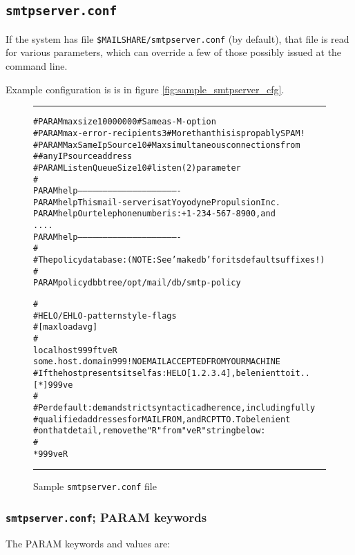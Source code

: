 \subsection{\tt smtpserver.conf}

If the system has file  {\tt \$MAILSHARE/smtpserver.conf} (by default),
that file is read for various parameters, which can override a few
of those possibly issued at the command line.

Example configuration is is in figure \vref{fig:sample_smtpserver_cfg}.

\begin{figure*}[ht]
\begin{alltt}\hrule\small\medskip
#PARAM maxsize          10000000    # Same as -M -option
#PARAM max-error-recipients    3    # More than this is propably SPAM!
#PARAM MaxSameIpSource        10    # Max simultaneous connections from
#                                   # any IP source address
#PARAM ListenQueueSize        10    # listen(2) parameter
#
PARAM help -------------------------------------------------------------
PARAM help  This mail-server is at Yoyodyne Propulsion Inc.
PARAM help  Our telephone number is: +1-234-567-8900, and
....
PARAM help -------------------------------------------------------------
#
# The policy database:  (NOTE: See  'makedb'  for its default suffixes!)
#
PARAM  policydb   btree  /opt/mail/db/smtp-policy

#
# HELO/EHLO-pattern     style-flags
#               [max loadavg]
#
localhost           999 ftveR
some.host.domain    999 !NO EMAIL ACCEPTED FROM YOUR MACHINE
# If the host presents itself as:  HELO [1.2.3.4], be lenient to it..
[*]                 999 ve
#
# Per default: demand strict syntactic adherence, including fully
# qualified addresses for  MAIL FROM, and RCPT TO.  To be lenient
# on that detail, remove the "R" from "veR" string below:
#
*                   999 veR
\medskip\hrule\end{alltt}\medskip
\caption{Sample {\tt smtpserver.conf} file\label{fig:sample_smtpserver_cfg}}
\end{figure*}


\subsubsection{{\tt smtpserver.conf}; PARAM keywords}

The PARAM keywords and values are:

